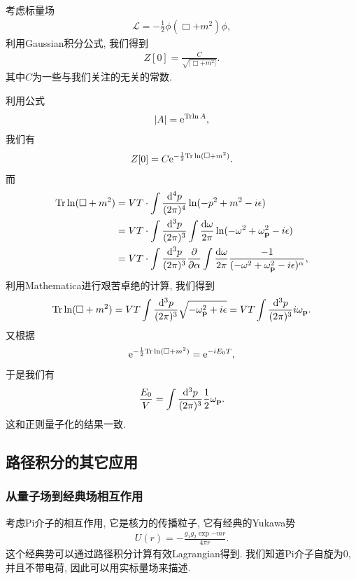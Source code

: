 考虑标量场
\begin{align}
    \mathcal L=-\frac12\phi(\Box+m^2)\phi,
\end{align}
利用Gaussian积分公式, 我们得到
\begin{align}
    Z[0]=\frac{C}{\sqrt{|\Box+m^2|}}.
\end{align}
其中$C$为一些与我们关注的无关的常数.

利用公式
\begin{align}
    |A|=\mathrm e^{\mathrm{Tr}{\ln A}},
\end{align}
我们有
\begin{align}
    Z[0]=C\mathrm e^{-\frac12\mathrm{Tr}\ln(\Box+m^2)}.
\end{align}
而
\begin{align}
    \mathrm{Tr}\ln(\Box+m^2)&=VT\cdot\int\frac{\mathrm d^4p}{(2\pi)^4}\ln(-p^2+m^2-i\epsilon)\\
    &=VT\cdot\int\frac{\mathrm d^3p}{(2\pi)^3}\int\frac{\mathrm d\omega}{2\pi}\ln(-\omega^2+\omega_{\mathbf{p}}^2-i\epsilon)\\
    &=VT\cdot\int\frac{\mathrm d^3p}{(2\pi)^3}\frac{\partial }{\partial \alpha}\int\frac{\mathrm d\omega}{2\pi}\frac{-1}{(-\omega^2+\omega_{\mathbf{p}}^2-i\epsilon)^\alpha},
\end{align}
利用Mathematica进行艰苦卓绝的计算, 我们得到
\begin{align}
    \mathrm{Tr}\ln(\Box+m^2)=VT\int\frac{\mathrm d^3p}{(2\pi)^3}\sqrt{-\omega_{\mathbf{p}}^2+i\epsilon}=VT\int\frac{\mathrm d^3p}{(2\pi)^3} i\omega_{\mathbf{p}}.
\end{align}
又根据
\begin{align}
    \mathrm e^{-\frac12\mathrm{Tr}\ln(\Box+m^2)}=\mathrm e^{-iE_0 T},
\end{align}
于是我们有
\begin{align}
    \frac{E_0}{V}=\int\frac{\mathrm d^3p}{(2\pi)^3}\frac12\omega_{\mathbf{p}}.
\end{align}
这和正则量子化的结果一致.

\subsection{路径积分的其它应用}
\subsubsection{从量子场到经典场相互作用}\label{pi-yukawa}
考虑Pi介子的相互作用, 它是核力的传播粒子, 它有经典的Yukawa势
\begin{align}
    U(r)=-\frac{g_1 g_2\exp{-mr}}{4\pi r}.
\end{align}
这个经典势可以通过路径积分计算有效Lagrangian得到. 我们知道Pi介子自旋为$0$, 并且不带电荷, 因此可以用实标量场来描述.

